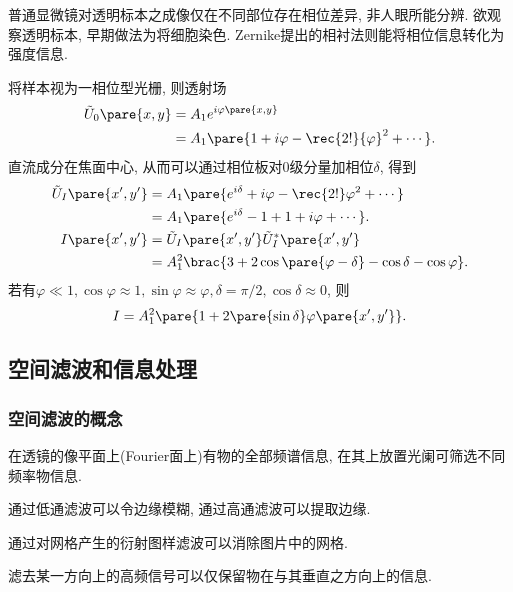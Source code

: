 \documentclass{ctexart}
\begin{document}
普通显微镜对透明标本之成像仅在不同部位存在相位差异, 非人眼所能分辨. 欲观察透明标本, 早期做法为将细胞染色. Zernike提出的相衬法则能将相位信息转化为强度信息.

\par
将样本视为一相位型光栅, 则透射场
\begin{align*}
    \tilde{U}_0\pare{x,y} &= A_1 e^{i\varphi\pare{x,y}} \\
    &= A_1 \pare{1+i\varphi - \rec{2!}{\varphi}^{2} + \cdots}.
\end{align*}
直流成分在焦面中心, 从而可以通过相位板对$0$级分量加相位$\delta$, 得到
\begin{align*}
    \tilde{U}_I\pare{x',y'} &= A_1\pare{e^{i\delta} + i\varphi - \rec{2!}\varphi^2 + \cdots} \\
    &= A_1\pare{e^{i\delta} - 1 + 1 + i\varphi + \cdots}. \\
    I\pare{x',y'} &= \tilde{U}_I\pare{x',y'}\tilde{U}_I^*\pare{x',y'} \\
    &= A_1^2 \brac{3 + 2\cos\pare{\varphi - \delta} - \cos\delta - \cos\varphi}.
\end{align*}
若有$\varphi \ll 1, \cos\varphi\approx 1, \sin\varphi\approx\varphi, \delta=\pi/2, \cos\delta \approx 0$, 则
\[ I = A_1^2 \pare{1+2\pare{\sin\delta} \varphi\pare{x',y'}}. \]



\subsection{空间滤波和信息处理} %
\label{sub:空间滤波和信息处理}

\subsubsection{空间滤波的概念} %
\label{ssub:空间滤波的概念}

在透镜的像平面上(Fourier面上)有物的全部频谱信息, 在其上放置光阑可筛选不同频率物信息.
\begin{ex}
    通过低通滤波可以令边缘模糊, 通过高通滤波可以提取边缘.
\end{ex}
\begin{ex}
    通过对网格产生的衍射图样滤波可以消除图片中的网格.
\end{ex}
\begin{ex}
    滤去某一方向上的高频信号可以仅保留物在与其垂直之方向上的信息.
\end{ex}
\end{document}
